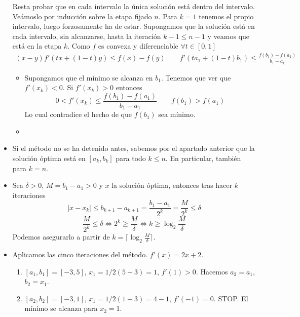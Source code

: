 \documentclass[twoside]{article}
\begin{document}
\begin{solucion}
\begin{itemize}
Resta probar que en cada intervalo la única solución está dentro del intervalo. Veámoslo por inducción sobre la etapa fijado $n$. Para $k=1$ tenemos el propio intervalo, luego forzosamente ha de estar. Supongamos que la solución está en cada intervalo, sin alcanzarse, hasta la iteración $k-1\leq n-1$ y veamos que está en la etapa $k$. Como $f$ es convexa y diferenciable $\forall t \in [0,1]$
\begin{gather*}
(x-y)f'(tx+(1-t)y) \leq f(x)-f(y) \qquad f'(ta_1+(1-t)b_1) \leq \frac{f(b_1)-f(a_1)}{b_1-a_1}
\end{gather*} 
\begin{itemize}
\item Supongamos que el mínimo se alcanza en $b_1$. Tenemos que ver que $f'(x_k)<0$. Si $f'(x_k)>0$ entonces
$$0<f'(x_k) \leq \frac{f(b_1)-f(a_1)}{b_1-a_1} \qquad f(b_1) > f(a_1)$$
Lo cual contradice el hecho de que $f(b_1)$ sea mínimo.
\item 
\end{itemize}
\item Si el método no se ha detenido antes, sabemos por el apartado anterior que la solución óptima está en $[a_k,b_k]$ para todo $k\leq n$. En particular, también para $k=n$.
\item Sea $\delta>0$, $M=b_1-a_1>0$ y $x$ la solución óptima, entonces tras hacer $k$ iteraciones  
$$
|x-x_k|\leq b_{k+1}-a_{k+1} = \frac{b_1-a_1}{2^k}=\frac{M}{2^k}\leq\delta
$$
$$\frac{M}{2^k}\leq\delta \Leftrightarrow 2^k \geq \frac{M}{\delta} \Leftrightarrow k \geq \log_2  \frac{M}{\delta}
$$
Podemos asegurarlo a partir de $k=\lceil\log_2  \frac{M}{\delta}\rceil$.
\item Aplicamos las cinco iteraciones del método. $f'(x)=2x+2$.
\begin{enumerate} 
\item $[a_1,b_1]=[-3,5]$, $x_1 = 1/2(5-3)= 1$, $f'(1)>0$. Hacemos $a_2=a_1$, $b_2=x_1$.
\item $[a_2,b_2]=[-3,1]$, $x_1 = 1/2(1-3)= 4-1$, $f'(-1)=0$. STOP. El mínimo se alcanza para $x_2 =1$.
\end{enumerate}
\end{itemize}

\end{solucion}

\newpage
\end{document}
